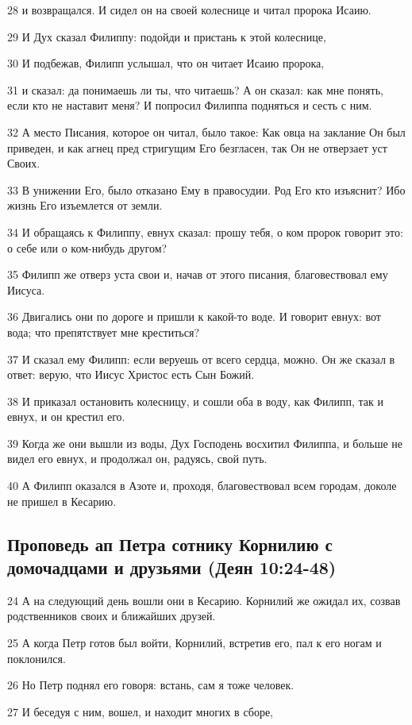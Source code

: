28 и возвращался. И сидел он на своей колеснице и читал пророка Исаию.

29 И Дух сказал Филиппу: подойди и пристань к этой колеснице,

30 И подбежав, Филипп услышал, что он читает Исаию пророка,

31 и сказал: да понимаешь ли ты, что читаешь? А он сказал: как мне понять, если кто не наставит меня? И попросил Филиппа подняться и сесть с ним.

32 А место Писания, которое он читал, было такое: Как овца на заклание Он был приведен, и как агнец пред стригущим Его безгласен, так Он не отверзает уст Своих.

33 В унижении Его, было отказано Ему в правосудии. Род Его кто изъяснит? Ибо жизнь Его изъемлется от земли.

34 И обращаясь к Филиппу, евнух сказал: прошу тебя, о ком пророк говорит это: о себе или о ком-нибудь другом?

35 Филипп же отверз уста свои и, начав от этого писания, благовествовал ему Иисуса.

36 Двигались они по дороге и пришли к какой-то воде. И говорит евнух: вот вода; что препятствует мне креститься?

37 И сказал ему Филипп: если веруешь от всего сердца, можно. Он же сказал в ответ: верую, что Иисус Христос есть Сын Божий.

38 И приказал остановить колесницу, и сошли оба в воду, как Филипп, так и евнух, и он крестил его.

39 Когда же они вышли из воды, Дух Господень восхитил Филиппа, и больше не видел его евнух, и продолжал он, радуясь, свой путь.

40 А Филипп оказался в Азоте и, проходя, благовествовал всем городам, доколе не пришел в Кесарию.

\subsection*{Проповедь ап Петра сотнику Корнилию с домочадцами и друзьями (Деян 10:24-48)}
24 А на следующий день вошли они в Кесарию. Корнилий же ожидал их, созвав родственников своих и ближайших друзей.

25 А когда Петр готов был войти, Корнилий, встретив его, пал к его ногам и поклонился.

26 Но Петр поднял его говоря: встань, сам я тоже человек.

27 И беседуя с ним, вошел, и находит многих в сборе,

